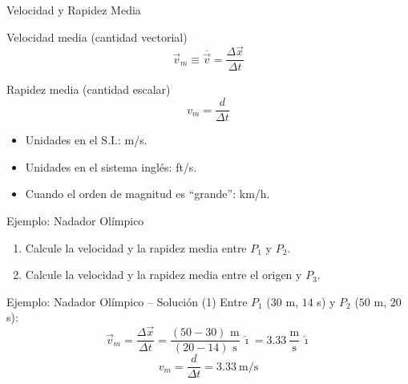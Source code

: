 \documentclass[aspectratio=169,xcolor=dvipsnames]{beamer}
\newcommand{\ii}{\hat{\imath}}
\begin{document}
\begin{frame}{Velocidad y Rapidez Media}
\begin{block}{Velocidad media (cantidad vectorial)}
\[
\vec v_m \equiv \overline{\vec v} = \frac{\Delta \vec x}{\Delta t}
\]
\end{block}
\begin{block}{Rapidez media (cantidad escalar)}
\[
v_m = \frac{d}{\Delta t}
\]
\end{block}
\begin{itemize}
\item Unidades en el S.I.: m/s.
\item Unidades en el sistema inglés: ft/s.
\item Cuando el orden de magnitud es ``grande'': km/h.
\end{itemize}
\end{frame}

\begin{frame}{Ejemplo: Nadador Olímpico}
\begin{center}
\end{center}
\begin{enumerate}
\item Calcule la velocidad y la rapidez media entre $P_1$ y $P_2$.
\item Calcule la velocidad y la rapidez media entre el origen y $P_3$.
\end{enumerate}
\end{frame}

\begin{frame}{Ejemplo: Nadador Olímpico -- Solución (1)}
Entre $P_1$ ($30$ m, $14$ s) y $P_2$ ($50$ m, $20$ s):
\[
\vec v_m = \frac{\Delta \vec x}{\Delta t} = \frac{(50-30)\text{ m}}{(20-14)\text{ s}}\,\ii = 3.33\ \frac{\text{m}}{\text{s}}\,\ii
\]
\[
v_m = \frac{d}{\Delta t} = 3.33\ \text{m/s}
\]
\end{frame}
\end{document}
